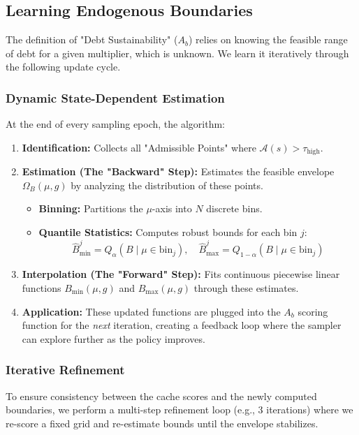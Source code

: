 \subsection{Learning Endogenous Boundaries}

The definition of "Debt Sustainability" ($A_b$) relies on knowing the feasible range of debt for a given multiplier, which is unknown. We learn it iteratively through the following update cycle.

\subsubsection{Dynamic State-Dependent Estimation}\label{sec:dynamic_bounds}
At the end of every sampling epoch, the algorithm:
\begin{enumerate}
    \item \textbf{Identification:} Collects all "Admissible Points" where $\mathcal{A}(s) > \tau_{\text{high}}$.
    \item \textbf{Estimation (The "Backward" Step):} Estimates the feasible envelope $\Omega_{B}(\mu, g)$ by analyzing the distribution of these points.
    \begin{itemize}
        \item \textbf{Binning:} Partitions the $\mu$-axis into $N$ discrete bins.
        \item \textbf{Quantile Statistics:} Computes robust bounds for each bin $j$:
        \[ \hat{B}_{\min}^j = Q_{\alpha}(B \mid \mu \in \text{bin}_j), \quad \hat{B}_{\max}^j = Q_{1-\alpha}(B \mid \mu \in \text{bin}_j) \]
    \end{itemize}
    \item \textbf{Interpolation (The "Forward" Step):} Fits continuous piecewise linear functions $B_{\min}(\mu, g)$ and $B_{\max}(\mu, g)$ through these estimates.
    \item \textbf{Application:} These updated functions are plugged into the $A_b$ scoring function for the \textit{next} iteration, creating a feedback loop where the sampler can explore further as the policy improves.
\end{enumerate}

\subsubsection{Iterative Refinement}
To ensure consistency between the cache scores and the newly computed boundaries, we perform a multi-step refinement loop (e.g., 3 iterations) where we re-score a fixed grid and re-estimate bounds until the envelope stabilizes.

